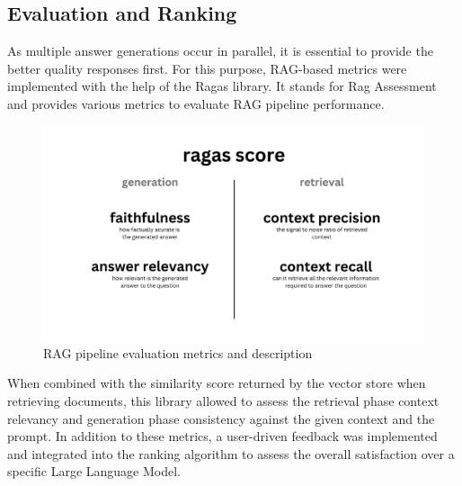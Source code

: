 \subsection{Evaluation and Ranking}
As multiple answer generations occur in parallel, it is essential to provide the better quality responses first. For this purpose, RAG-based metrics were implemented with the help of the Ragas library. It stands for Rag Assessment and provides various metrics to evaluate RAG pipeline performance.
\begin{figure}[htbp]
    \centering
    \includegraphics[width=\linewidth]{./figures/ragas-metrics.png}
    \caption{RAG pipeline evaluation metrics and description}
\end{figure}\newline
When combined with the similarity score returned by the vector store when retrieving documents, this library allowed to assess the retrieval phase context relevancy and generation phase consistency against the given context and the prompt.
In addition to these metrics, a user-driven feedback was implemented and integrated into the ranking algorithm to assess the overall satisfaction over a specific Large Language Model.
